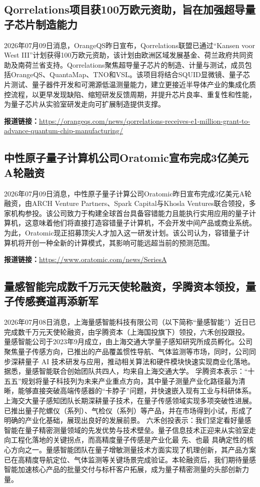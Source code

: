 \documentclass[12pt,a4paper]{ctexart}
\begin{document}
\subsection{ Qorrelations项目获100万欧元资助，旨在加强超导量子芯片制造能力 }

2026年07月09日消息，OrangeQS昨日宣布，Qorrelations联盟已通过“Kansen voor West III”计划获得100万欧元资助，该计划由欧洲区域发展基金、荷兰政府共同资助及南荷兰省支持。Qorrelations聚焦超导量子芯片的制造、计量与测试，成员包括OrangeQS、QuantaMap、TNO和VSL。该项目将结合SQUID显微镜、量子芯片测试、量子器件开发和可溯源低温测量能力，建立更接近半导体产业的集成化质控流程，以更早发现缺陷、缩短研发反馈周期，并提升芯片良率、重复性和性能，为量子芯片从实验室研发走向可扩展制造提供支撑。

\noindent\textbf{报道链接：}\url{https://orangeqs.com/news/qorrelations-receives-e1-million-grant-to-advance-quantum-chip-manufacturing/}

\subsection{ 中性原子量子计算机公司Oratomic宣布完成3亿美元A轮融资 }

2026年07月09日消息，中性原子量子计算公司Oratomic昨日宣布完成3亿美元A轮融资，由ARCH Venture Partners、Spark Capital与Khosla Ventures联合领投，多家机构参投。该公司致力于构建全球首台具备容错能力且能执行实用应用的量子计算机，这意味着他们将直接打造容错量子计算机，不会开发中间产品或商业系统。为此，Oratomic现正招募顶尖人才加入这一研发计划。该公司认为，容错量子计算机将开创一种全新的计算模式，其影响可能远超当前的预测范围。

\noindent\textbf{报道链接：}\url{https://www.oratomic.com/news/SeriesA}

\subsection{ 量感智能完成数千万元天使轮融资，孚腾资本领投，量子传感赛道再添新军 }

2026年07月08日消息，上海量感智能科技有限公司（以下简称“量感智能”）近日已完成数千万元天使轮融资，由孚腾资本（上海国投旗下）领投，六禾创投跟投。 量感智能公司于2023年9月成立，由上海交通大学量子感知研究所成员孵化。公司聚焦量子传感方向，已推出的产品覆盖惯性导航、气体监测等市场，同时，公司同步深耕量子 AI 技术研发与应用，推动相关算法和硬件模块快速实现商业化落地。 据悉，量感智能联合创始团队共四人，均来自上海交通大学。 孚腾资本表示：“十五五”规划将量子科技列为未来产业重点方向，其中量子测量产业化路径最为清晰，能够直接突破高端传感器的“卡脖子”问题，并快速嵌入现有工业与科研体系。上海交大量子感知团队长期深耕量子技术，在量子传感领域实现多项突破性进展。已推出量子陀螺仪（系列）、气检仪（系列）等产品，并在市场得到小试，形成了明确的产业化基础，展现出良好的发展前景。 六禾创投表示：我们坚定看好量感智能在量子精密测量领域的先发优势与技术壁垒。量子信息技术正迎来从实验室走向工程化落地的关键拐点，而高精度量子传感是产业化最 先、也最 具确定性的核心方向之一。量感智能团队在量子增敏测量技术方面实现了机理创新，其产品方案已在高精度导航定位、气体监测等关键场景完成验证。本轮融资后，我们期待量感智能加速核心产品的批量交付与标杆客户拓展，成为量子精密测量的头部创新力量。
\end{document}
